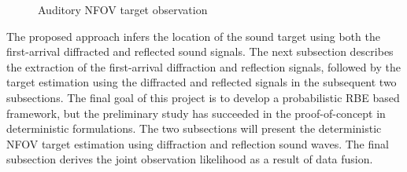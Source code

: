 \documentclass[letterpaper, 10 pt, conference]{ieeeconf}  %
\begin{document}
\begin{figure}[ht]
	\centering
	\caption{Auditory NFOV target observation}
	\label{fig:auditory_approach}
\end{figure}

The proposed approach infers the location of the sound target using both the first-arrival diffracted and reflected sound signals.  The next subsection describes the extraction of the first-arrival diffraction and reflection signals, followed by the target estimation using the diffracted and reflected signals in the subsequent two subsections.  The final goal of this project is to develop a probabilistic RBE based framework, but the preliminary study has succeeded in the proof-of-concept in deterministic formulations.  The two subsections will present the deterministic NFOV target estimation using diffraction and reflection sound waves.  The final subsection derives the joint observation likelihood as a result of data fusion.  
\end{document}
